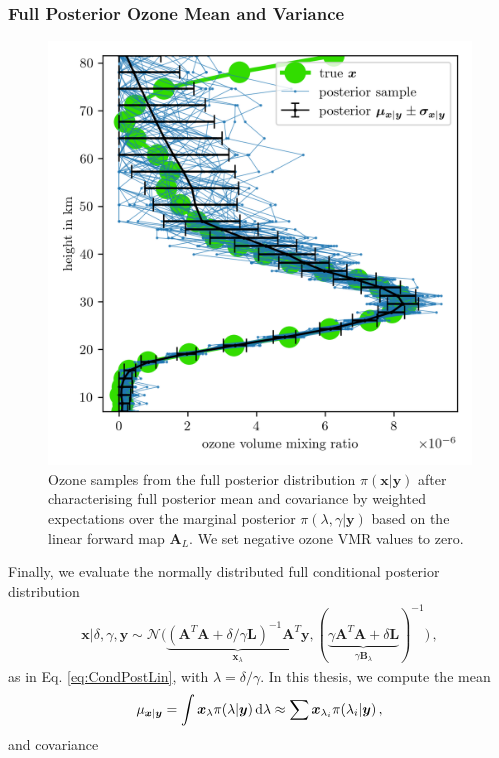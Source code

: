 \subsubsection{Full Posterior Ozone Mean and Variance}
\label{subsec:firstCond}
\begin{figure}[ht!]
	\centering
	\includegraphics{FirstTestRes.png}
	\caption[Ozone samples of the full posterior.]{Ozone samples from the full posterior distribution $\pi(\bm{x}| \bm{y})$ after characterising full posterior mean and covariance by weighted expectations over the marginal posterior $\pi(\lambda,\gamma | \bm{y})$ based on the linear forward map $\bm{A}_L$. We set negative ozone VMR values to zero.}
	\label{fig:O3Samp}
\end{figure}
Finally, we evaluate the normally distributed full conditional posterior distribution
\begin{align}
	\bm{x}| \delta, \gamma, \bm{y}  \sim \mathcal{N}\big( \underbrace{ (\bm{A}^T \bm{A} + \delta / \gamma \bm{L} )^{-1} \bm{A}^T \bm{y}}_{\bm{x}_{\lambda}}, ( \underbrace{ \gamma \bm{A}^T \bm{A} + \delta \bm{L} }_{\gamma \bm{B}_{\lambda}}  )^{-1} \big) \, \label{eq:CondPost},
\end{align}
as in Eq. \ref{eq:CondPostLin}, with $\lambda = \delta / \gamma $.
In this thesis, we compute the mean
\begin{align}
	\mu_{\bm{x}|\bm{y}} = \int \bm{x}_{\lambda} \pi(\lambda| \bm{y}) \mathop{}\!\mathrm{d}\lambda \approx \sum \bm{x}_{\lambda_i} \pi(\lambda_i| \bm{y}) \, , \label{eq:MeanInt}
\end{align} and covariance
